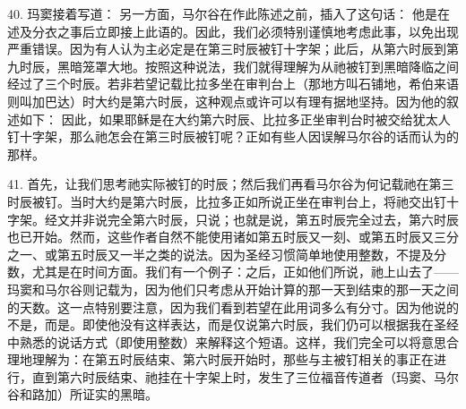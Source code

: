 40. 玛窦接着写道： 另一方面，马尔谷在作此陈述之前，插入了这句话： 他是在述及分衣之事后立即接上此语的。因此，我们必须特别谨慎地考虑此事，以免出现严重错误。因为有人认为主必定是在第三时辰被钉十字架；此后，从第六时辰到第九时辰，黑暗笼罩大地。按照这种说法，我们就得理解为从祂被钉到黑暗降临之间经过了三个时辰。若非若望记载比拉多坐在审判台上（那地方叫石铺地，希伯来语则叫加巴达）时大约是第六时辰，这种观点或许可以有理有据地坚持。因为他的叙述如下： 因此，如果耶稣是在大约第六时辰、比拉多正坐审判台时被交给犹太人钉十字架，那么祂怎会在第三时辰被钉呢？正如有些人因误解马尔谷的话而认为的那样。\par

41. 首先，让我们思考祂实际被钉的时辰；然后我们再看马尔谷为何记载祂在第三时辰被钉。当时大约是第六时辰，比拉多正如所说正坐在审判台上，将祂交出钉十字架。经文并非说完全第六时辰，只说；也就是说，第五时辰完全过去，第六时辰也已开始。然而，这些作者自然不能使用诸如第五时辰又一刻、或第五时辰又三分之一、或第五时辰又一半之类的说法。因为圣经习惯简单地使用整数，不提及分数，尤其是在时间方面。我们有一个例子：之后，正如他们所说，祂上山去了——玛窦和马尔谷则记载为，因为他们只考虑从开始计算的那一天到结束的那一天之间的天数。这一点特别要注意，因为我们看到若望在此用词多么有分寸。因为他说的不是，而是。即使他没有这样表达，而是仅说第六时辰，我们仍可以根据我在圣经中熟悉的说话方式（即使用整数）来解释这个短语。这样，我们完全可以将意思合理地理解为：在第五时辰结束、第六时辰开始时，那些与主被钉相关的事正在进行，直到第六时辰结束、祂挂在十字架上时，发生了三位福音传道者（玛窦、马尔谷和路加）所证实的黑暗。\par

